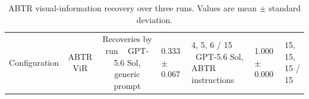 \begin{table}[H]
\centering
\caption{ABTR visual-information recovery over three runs. Values are mean $\pm$ standard deviation.}
\label{tab:autosam_abtr_vision}
\begin{tabular}{lcc}
\hline
Configuration & ABTR ViR & Recoveries by run \
\hline
GPT-5.6 Sol, generic prompt & 0.333 $\pm$ 0.067 & 4, 5, 6 / 15 \
GPT-5.6 Sol, ABTR instructions & 1.000 $\pm$ 0.000 & 15, 15, 15 / 15 \
\hline
\end{tabular}
\end{table}
